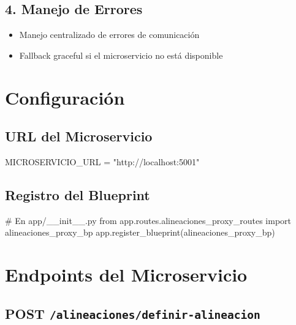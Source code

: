 \documentclass[
  spanish,
  11pt,
  letterpaper,
]{book}
\newenvironment{Shaded}{\begin{snugshade}}{\end{snugshade}}
\newcommand{\CommentTok}[1]{\textcolor[rgb]{0.37,0.37,0.37}{#1}}
\newcommand{\ImportTok}[1]{\textcolor[rgb]{0.00,0.46,0.62}{#1}}
\newcommand{\NormalTok}[1]{\textcolor[rgb]{0.00,0.23,0.31}{#1}}
\newcommand{\OperatorTok}[1]{\textcolor[rgb]{0.37,0.37,0.37}{#1}}
\newcommand{\StringTok}[1]{\textcolor[rgb]{0.13,0.47,0.30}{#1}}
\providecommand{\tightlist}{%
  \setlength{\itemsep}{0pt}\setlength{\parskip}{0pt}}
\begin{document}
\subsection{4. Manejo de Errores}\label{manejo-de-errores}

\begin{itemize}
\tightlist
\item
  Manejo centralizado de errores de comunicación
\item
  Fallback graceful si el microservicio no está disponible
\end{itemize}

\section{Configuración}\label{configuraciuxf3n}

\subsection{URL del Microservicio}\label{url-del-microservicio}

\begin{Shaded}
\begin{Highlighting}[]
\NormalTok{MICROSERVICIO\_URL }\OperatorTok{=} \StringTok{"http://localhost:5001"}
\end{Highlighting}
\end{Shaded}

\subsection{Registro del Blueprint}\label{registro-del-blueprint}

\begin{Shaded}
\begin{Highlighting}[]
\CommentTok{\# En app/\_\_init\_\_.py}
\ImportTok{from}\NormalTok{ app.routes.alineaciones\_proxy\_routes }\ImportTok{import}\NormalTok{ alineaciones\_proxy\_bp}
\NormalTok{app.register\_blueprint(alineaciones\_proxy\_bp)}
\end{Highlighting}
\end{Shaded}

\section{Endpoints del Microservicio}\label{endpoints-del-microservicio}

\subsection{\texorpdfstring{POST
\texttt{/alineaciones/definir-alineacion}}{POST /alineaciones/definir-alineacion}}\label{post-alineacionesdefinir-alineacion}
\end{document}
